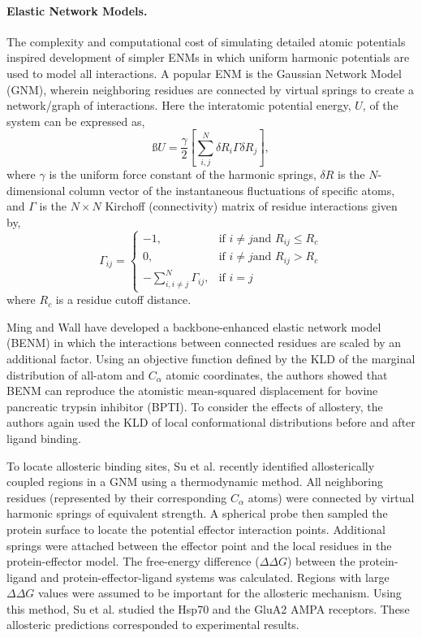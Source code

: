 \paragraph{Elastic Network Models.} The complexity and computational cost of simulating detailed atomic potentials inspired development of simpler ENMs in which uniform harmonic potentials are used to model all interactions.\cite{Tirion1996a,Bahar1997a,Haliloglu1997a} A popular ENM is the Gaussian Network Model (GNM), wherein neighboring residues are connected by virtual springs to create a network/graph of interactions. Here the interatomic potential energy, $U$, of the system can be expressed as,
\begin{equation}ß
    U = \frac{\gamma}{2}\left[\sum_{i,j}^{N}\delta R_i\Gamma\delta R_j\right],
\end{equation}
where $\gamma$ is the uniform force constant of the harmonic springs, ${\delta R}$ is the $N$-dimensional column vector of the instantaneous fluctuations of specific atoms, and $\Gamma$ is the $N\times N$ Kirchoff (connectivity) matrix of residue interactions given by,
\begin{equation}
    \Gamma_{ij} = \begin{cases}
        -1, & \text{if } i \neq j \text{and } R_{ij} \leq R_c\\
        0, & \text{if } i \neq j \text{and } R_{ij} > R_c\\
        -\sum_{i,i\neq j}^N \Gamma_{ij}, & \text{if } i = j
    \end{cases}
\end{equation}
where $R_c$ is a residue cutoff distance.
\par Ming and Wall have developed a backbone-enhanced elastic network model (BENM) in which the interactions between connected residues are scaled by an additional factor. Using an objective function defined by the KLD of the marginal distribution of all-atom and $C_{\alpha}$ atomic coordinates, the authors showed that BENM can reproduce the atomistic mean-squared displacement for bovine pancreatic trypsin inhibitor (BPTI).\cite{Ming2005a} To consider the effects of allostery, the authors again used the KLD of local conformational distributions before and after ligand binding.\cite{Ming2005a}
\par To locate allosteric binding sites, Su et al. recently identified allosterically coupled regions in a GNM using a thermodynamic method.\cite{Su2014c} All neighboring residues (represented by their corresponding $C_{\alpha}$ atoms) were connected by virtual harmonic springs of equivalent strength. A spherical probe then sampled the protein surface to locate the potential effector interaction points. Additional springs were attached between the effector point and the local residues in the protein-effector model. The free-energy difference ($\Delta\Delta G$) between the protein-ligand and protein-effector-ligand systems was calculated. Regions with large $\Delta\Delta G$ values were assumed to be important for the allosteric mechanism. Using this method, Su et al. studied the Hsp70 and the GluA2 AMPA receptors. These allosteric predictions corresponded to experimental results.\cite{Su2014c}
